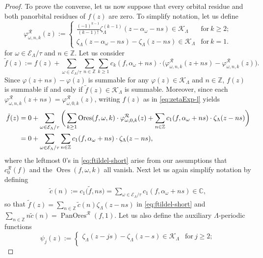 \documentclass[preprint,12pt]{elsarticle}
\numberwithin{equation}{section} %
\theoremstyle{theorem}
\theoremstyle{definition}
\newcommand{\bk}{\mathcal{K}} %
\newcommand{\bkl}{\bk_{\Lambda}} %
\newcommand{\ec}{\mathcal{E}} %
\newcommand{\ecl}{\ec_{\Lambda}} %
\newcommand{\orbitl}{{\ecl/\tau}} %
\newcommand{\C}{\mathbb{C}} %
\newcommand{\zl}{\zeta_{\Lambda}}
\DeclareMathOperator{\ores}{Ores}
\DeclareMathOperator{\pano}{PanOres}
\begin{document}
\begin{proof}
    To prove the converse, let us now suppose that every orbital residue and both panorbital residues of $f(z)$ are zero. To simplify notation, let us define \begin{equation}\label{eq:phil}\varphi_{\omega,n,k}^\mathcal{R}(z):=\begin{cases} \frac{(-1)^{k-1}}{(k-1)!}\zl^{(k-1)}(z-\alpha_\omega-ns)\in\bkl &\text{for} \ k\geq 2; \\ \zl(z-\alpha_\omega-ns)-\zl(z-ns)\in\bkl & \text{for} \ k=1.\end{cases}\end{equation}for $\omega\in\orbitl$ and  $n\in\mathbb{Z}$. Let us consider 
    \begin{equation}\tilde{f}(z):=f(z)+\sum_{\omega\in\orbitl}\sum_{n\in\mathbb{Z}}\sum_{k\geq 1}c_k(f,\alpha_\omega+ns)\cdot\bigl(\varphi_{\omega,n,k}^\mathcal{R}(z+ns)-\varphi_{\omega,n,k}^\mathcal{R}(z)\bigr).\label{eq:ftildel-def}
    \end{equation}
    Since $\varphi(z+ns)-\varphi(z)$ is summable for any $\varphi(z)\in\bkl$ and $n\in\mathbb{Z}$, $f(z)$ is summable if and only if $\tilde{f}(z)\in\bkl$ is summable. Moreover, since each $\varphi_{\omega,n,k}^{\mathcal{R}}(z+ns) = \varphi_{\omega,0,k}^{\mathcal{R}}(z)$, writing $f(z)$ as in \eqref{eq:zetaExp-l} yields 
    \begin{align}
    \tilde{f}(z)&=0+\sum_{\omega\in\orbitl}\bigg(\sum_{k\geq 1}\ores(f,\omega,k)\cdot\varphi_{\omega,0,k}^\mathcal{R}(z)  +\sum_{n\in\mathbb{Z}}c_1(f,\alpha_\omega+ns)\cdot\zl(z-ns)\bigg) \notag\\
    &=0+\sum_{\omega\in\orbitl}\sum_{n\in\mathbb{Z}}c_1(f,\alpha_\omega+ns)\cdot\zl(z-ns),\label{eq:ftildel-short}\end{align} where the leftmost $0$'s in \eqref{eq:ftildel-short} arise from our assumptions that $c_0^\mathcal{R}(f)$ and the $\ores(f,\omega,k)$ all vanish. Next let us again simplify notation by defining \begin{gather*}\tilde{c}(n):=c_1\bigl(\tilde{f},ns\bigr)=\sum_{\omega\in\orbitl}c_1(f,\alpha_\omega+ns)\in\C,\end{gather*}
    so that $\tilde{f}(z)=\sum_{n\in\mathbb{Z}}\tilde{c}(n)\zl(z-ns)$ in \eqref{eq:ftildel-short} and $\sum_{n\in\mathbb{Z}}n\tilde{c}(n)=\pano^\mathcal{R}(f,1)$. Let us also define the auxiliary $\Lambda$-periodic functions
    \begin{equation}\label{eq:psil-def}
        \psi_j(z):=
        \begin{cases}
            \zl(z-js)-\zl(z-s)\in\bkl & \text{for} \ j\geq 2;\\

\end{cases}
\end{equation}
\end{proof}
\end{document}
